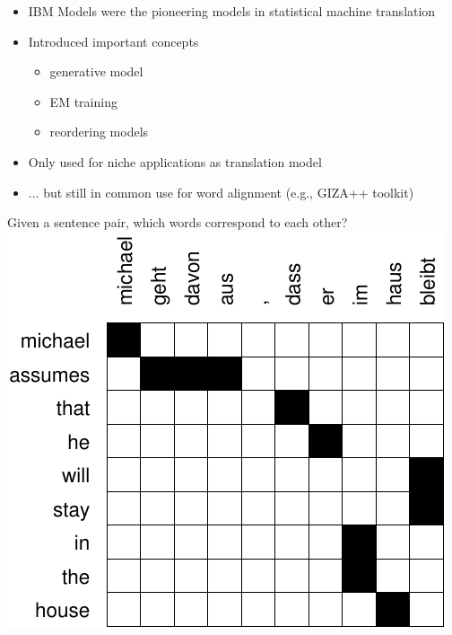 \documentclass[landscape]{slides}
\begin{document}
\vspace{10mm}
\begin{itemize}
\item IBM Models were the pioneering models in statistical machine translation
\item Introduced important concepts
\begin{itemize}
\item generative model
\item EM training
\item reordering models
\end{itemize}
\vspace{5mm}
\item Only used for niche applications as translation model
\item ... but still in common use for word alignment (e.g., GIZA++ toolkit)
\end{itemize}


\vspace{5mm}
\begin{center}
Given a sentence pair, which words correspond to each other?\\[5mm]
\includegraphics[scale=1.5]{michael-alignment.pdf}
\end{center}

\end{document}
